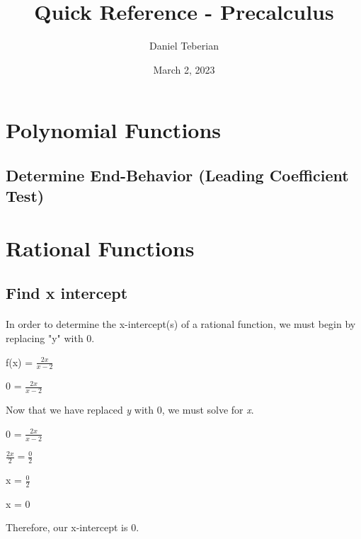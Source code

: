 \documentclass{article}
\begin{document}
\title{Quick Reference - Precalculus}
\author{Daniel Teberian}
\date{March 2, 2023{}}
\maketitle{}
\newpage

\section{Polynomial Functions}
\subsection{Determine End-Behavior (Leading Coefficient Test)}



\section{Rational Functions}
\subsection{Find x intercept}
\paragraph{}In order to determine the x-intercept(s) of a rational function, we must begin by replacing "y" with 0. \newline \newline

f(x) = $\frac{2x}{x-2}
$
\newline

0 = $\frac{2x}{x-2}
$
\newline

Now that we have replaced \textit{y} with 0, we must solve for \textit{x}. \newline

0 = $\frac{2x}{x-2}
$
\newline

$\frac{2x}{2} = \frac{0}{2}
$
\newline

x = $\frac{0}{2}
$
\newline

x = 0
\newline \newline

Therefore, our x-intercept is 0.
\end{document}
